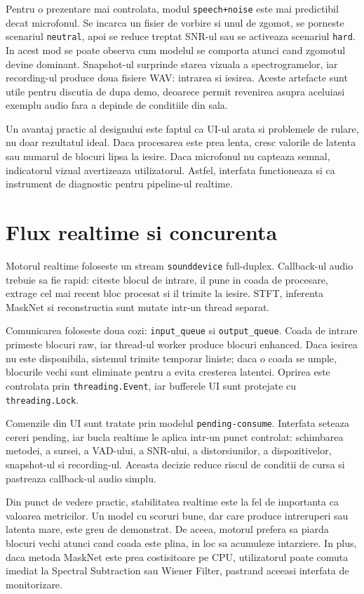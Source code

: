 \documentclass[12pt,a4paper]{report}
\begin{document}
Pentru o prezentare mai controlata, modul \texttt{speech+noise} este mai
predictibil decat microfonul. Se incarca un fisier de vorbire si unul de zgomot,
se porneste scenariul \texttt{neutral}, apoi se reduce treptat SNR-ul sau se
activeaza scenariul \texttt{hard}. In acest mod se poate observa cum modelul se
comporta atunci cand zgomotul devine dominant. Snapshot-ul surprinde starea
vizuala a spectrogramelor, iar recording-ul produce doua fisiere WAV: intrarea
si iesirea. Aceste artefacte sunt utile pentru discutia de dupa demo, deoarece
permit revenirea asupra aceluiasi exemplu audio fara a depinde de conditiile
din sala.

Un avantaj practic al designului este faptul ca UI-ul arata si problemele de
rulare, nu doar rezultatul ideal. Daca procesarea este prea lenta, cresc
valorile de latenta sau numarul de blocuri lipsa la iesire. Daca microfonul nu
capteaza semnal, indicatorul vizual avertizeaza utilizatorul. Astfel, interfata
functioneaza si ca instrument de diagnostic pentru pipeline-ul realtime.

\section{Flux realtime si concurenta}

Motorul realtime foloseste un stream \texttt{sounddevice} full-duplex. Callback-ul
audio trebuie sa fie rapid: citeste blocul de intrare, il pune in coada de
procesare, extrage cel mai recent bloc procesat si il trimite la iesire. STFT,
inferenta MaskNet si reconstructia sunt mutate intr-un thread separat.

Comunicarea foloseste doua cozi: \texttt{input\_queue} si \texttt{output\_queue}.
Coada de intrare primeste blocuri raw, iar thread-ul worker produce blocuri
enhanced. Daca iesirea nu este disponibila, sistemul trimite temporar liniste;
daca o coada se umple, blocurile vechi sunt eliminate pentru a evita cresterea
latentei. Oprirea este controlata prin \texttt{threading.Event}, iar bufferele
UI sunt protejate cu \texttt{threading.Lock}.

Comenzile din UI sunt tratate prin modelul \texttt{pending-consume}. Interfata
seteaza cereri pending, iar bucla realtime le aplica intr-un punct controlat:
schimbarea metodei, a sursei, a VAD-ului, a SNR-ului, a distorsiunilor, a
dispozitivelor, snapshot-ul si recording-ul. Aceasta decizie reduce riscul de
conditii de cursa si pastreaza callback-ul audio simplu.

Din punct de vedere practic, stabilitatea realtime este la fel de importanta ca
valoarea metricilor. Un model cu scoruri bune, dar care produce intreruperi sau
latenta mare, este greu de demonstrat. De aceea, motorul prefera sa piarda
blocuri vechi atunci cand coada este plina, in loc sa acumuleze intarziere. In
plus, daca metoda MaskNet este prea costisitoare pe CPU, utilizatorul poate
comuta imediat la Spectral Subtraction sau Wiener Filter, pastrand aceeasi
interfata de monitorizare.
\end{document}
